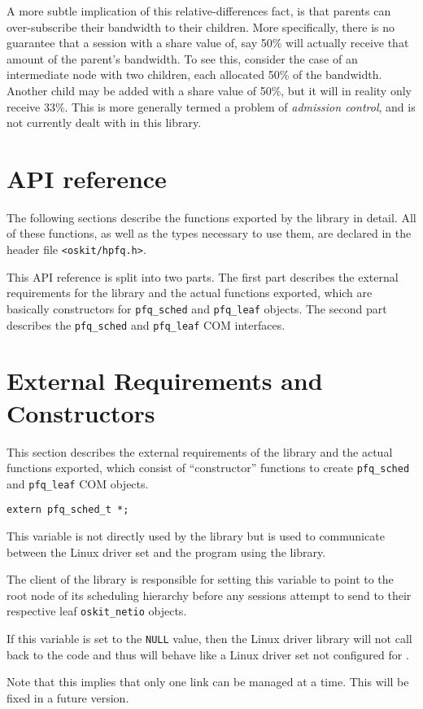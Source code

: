 A more subtle implication of this relative-differences fact,
is that parents can over-subscribe their bandwidth to their children.
More specifically, there is no guarantee that a session with a share value of,
say 50\%
will actually receive that amount of the parent's bandwidth.
To see this, consider the case of an intermediate node with two children,
each allocated 50\% of the bandwidth.
Another child may be added with a share value of 50\%,
but it will in reality only receive 33\%.
This is more generally termed a problem of \emph{admission control},
and is not currently dealt with in this library.


\section{API reference}
\label{hpfq-api}

The following sections describe the functions exported by the \hpfq{}
library in detail.
All of these functions, as well as the types necessary to use them,
are declared in the header file \texttt{<oskit/hpfq.h>}.

This API reference is split into two parts.
The first part describes the external requirements for the library and the
actual functions exported,
which are basically constructors for \texttt{pfq_sched} and
\texttt{pfq_leaf} objects.
The second part describes the \texttt{pfq_sched} and
\texttt{pfq_leaf} COM interfaces.


\section{External Requirements and Constructors}

This section describes the external requirements of the library
and the actual functions exported,
which consist of ``constructor'' functions to create \texttt{pfq_sched} and
\texttt{pfq_leaf} COM objects.


\begin{apisyn}

	\texttt{extern pfq_sched_t *;}
\end{apisyn}
\begin{apidesc}
	This variable is not directly used by the \hpfq{} library but
	is used to communicate between the Linux driver set and the
	program using the \hpfq{} library.

	The client of the \hpfq{} library is responsible for setting
	this variable to point to the root node of its scheduling
	hierarchy before any sessions attempt to send to their
	respective leaf \texttt{oskit_netio} objects.

	If this variable is set to the \texttt{NULL} value,
	then the Linux driver library will not call back to the
	\hpfq{} code and thus will behave like a Linux driver set not
	configured for \hpfq{}.

	Note that this implies that only one link can be managed at a time.
	This will be fixed in a future version.
\end{apidesc}

